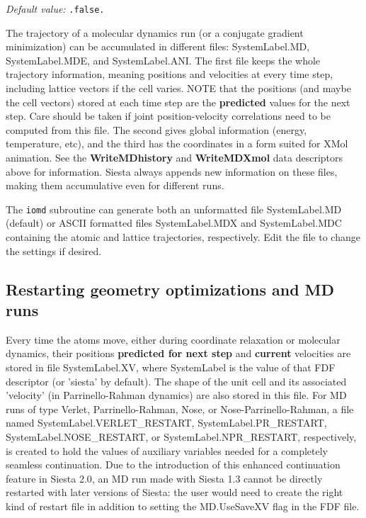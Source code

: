 \documentclass[11pt]{article}
\begin{document}
\begin{description}
{\it Default value:} {\tt .false.}


The trajectory of a molecular dynamics run (or a conjugate gradient
minimization) can be accumulated in different files: SystemLabel.MD,
SystemLabel.MDE, and SystemLabel.ANI. The first file keeps the whole trajectory
information, meaning positions and velocities at every time step, 
including lattice vectors if the cell varies. NOTE that the positions
(and maybe the cell vectors) stored at each time step are the {\bf
  predicted} values for the next step. Care should be taken if joint
position-velocity correlations need to be computed from this file.
The second gives global information (energy, temperature, etc),
and the third has the coordinates in a form suited for XMol animation.
See the {\bf WriteMDhistory} and {\bf WriteMDXmol} data descriptors 
above for information. {\sc Siesta} always appends new information on these
files, making them accumulative even for different runs.

The {\tt iomd} subroutine can generate both
an unformatted file SystemLabel.MD (default) or  ASCII formatted files
SystemLabel.MDX and SystemLabel.MDC containing the atomic and lattice
trajectories, respectively. Edit the file to change the settings if desired.


\end{description}

\subsection{Restarting geometry optimizations and MD runs}

Every time the atoms move, either during coordinate relaxation or
molecular dynamics, their positions {\bf predicted for next step} and
{\bf current} velocities are stored in file SystemLabel.XV, where
SystemLabel is the value of that FDF descriptor (or 'siesta' by
default).  The shape of the unit cell and its associated 'velocity'
(in Parrinello-Rahman dynamics) are also stored in this file. For MD
runs of type Verlet, Parrinello-Rahman, Nose, or
Nose-Parrinello-Rahman, a file named SystemLabel.VERLET\_RESTART,
SystemLabel.PR\_RESTART, SystemLabel.NOSE\_RESTART, or
SystemLabel.NPR\_RESTART, respectively, is created to hold the values
of auxiliary variables needed for a completely seamless
continuation. Due to the introduction of this enhanced continuation
feature in Siesta 2.0, an MD run made with Siesta 1.3 cannot be
directly restarted with later versions of Siesta: the user would need
to create the right kind of restart file in addition to setting the
MD.UseSaveXV flag in the FDF file.
\end{document}
